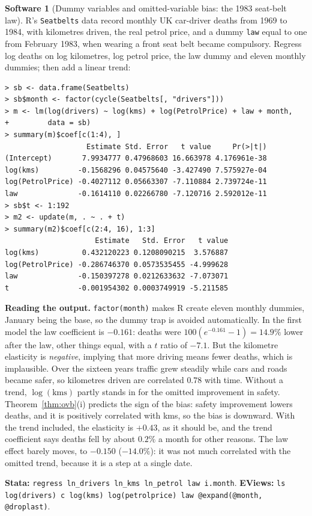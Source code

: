 \documentclass[11pt,a4paper]{article}
\numberwithin{equation}{section}
\theoremstyle{definition}
\newtheorem{software}[thm]{Software}
\begin{document}
\begin{software}[Dummy variables and omitted-variable bias: the 1983 seat-belt law]
\label{sw:seatbelt}
R's \texttt{Seatbelts} data record monthly UK car-driver deaths from 1969 to 1984, with kilometres driven, the real petrol price, and a dummy
\texttt{law} equal to one from February 1983, when wearing a front seat belt became compulsory. Regress log deaths on log kilometres, log petrol price,
the law dummy and eleven monthly dummies; then add a linear trend:
{\small\begin{verbatim}
> sb <- data.frame(Seatbelts)
> sb$month <- factor(cycle(Seatbelts[, "drivers"]))
> m <- lm(log(drivers) ~ log(kms) + log(PetrolPrice) + law + month,
+         data = sb)
> summary(m)$coef[c(1:4), ]
                   Estimate Std. Error   t value     Pr(>|t|)
(Intercept)       7.9934777 0.47968603 16.663978 4.176961e-38
log(kms)         -0.1568296 0.04575640 -3.427490 7.575927e-04
log(PetrolPrice) -0.4027112 0.05663307 -7.110884 2.739724e-11
law              -0.1614110 0.02266780 -7.120716 2.592012e-11
> sb$t <- 1:192
> m2 <- update(m, . ~ . + t)
> summary(m2)$coef[c(2:4, 16), 1:3]
                     Estimate   Std. Error   t value
log(kms)          0.432120223 0.1208090215  3.576887
log(PetrolPrice) -0.286746370 0.0573535455 -4.999628
law              -0.150397278 0.0212633632 -7.073071
t                -0.001954302 0.0003749919 -5.211585
\end{verbatim}}
\textbf{Reading the output.} \texttt{factor(month)} makes R create eleven monthly dummies, January being the base, so the dummy trap is avoided
automatically. In the first model the law coefficient is $-0.161$: deaths were $100(e^{-0.161} - 1) = 14.9\%$ lower after the law, other things equal, with a
$t$ ratio of $-7.1$. But the kilometre elasticity is \emph{negative}, implying that more driving means fewer deaths, which is implausible. Over the sixteen
years traffic grew steadily while cars and roads became safer, so kilometres driven are correlated $0.78$ with time. Without a trend, $\log(\text{kms})$
partly stands in for the omitted improvement in safety. Theorem~\ref{thm:ovb}(i) predicts the sign of the bias: safety improvement lowers deaths, and it
is positively correlated with kms, so the bias is downward. With the trend included, the elasticity is $+0.43$, as it should be, and the trend
coefficient says deaths fell by about $0.2\%$ a month for other reasons. The law effect barely moves, to $-0.150$ ($-14.0\%$): it was not much
correlated with the omitted trend, because it is a step at a single date.

\textbf{Stata:} \texttt{regress ln\_drivers ln\_kms ln\_petrol law i.month}. \textbf{EViews:} \texttt{ls log(drivers) c log(kms)
log(petrolprice) law @expand(@month, @droplast)}.
\end{software}
\end{document}
